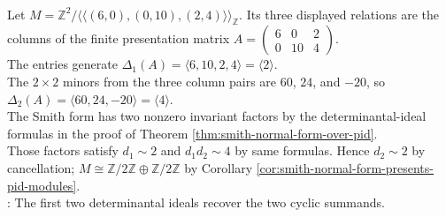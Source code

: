 \begin{example} \label{ex:smith-normal-form-abelian-group-decomposition} \\
Let $M=\mathbb{Z}^2/\langle\!\langle(6,0),(0,10),(2,4)\rangle\!\rangle_{\mathbb{Z}}$. Its three displayed relations are the columns of the finite presentation matrix $A=\left(\begin{smallmatrix}6&0&2\\0&10&4\end{smallmatrix}\right)$.\\
The entries generate $\Delta_1(A)=\langle6,10,2,4\rangle=\langle2\rangle$.\\
The $2\times2$ minors from the three column pairs are $60$, $24$, and $-20$, so $\Delta_2(A)=\langle60,24,-20\rangle=\langle4\rangle$.\\
The Smith form has two nonzero invariant factors by the determinantal-ideal formulas in the proof of Theorem \ref{thm:smith-normal-form-over-pid}.\\
Those factors satisfy $d_1\sim2$ and $d_1d_2\sim4$ by same formulas. Hence $d_2\sim2$ by cancellation; $M\cong\mathbb{Z}/2\mathbb{Z}\oplus\mathbb{Z}/2\mathbb{Z}$ by Corollary \ref{cor:smith-normal-form-presents-pid-modules}.\\
: The first two determinantal ideals recover the two cyclic summands.
\end{example}
